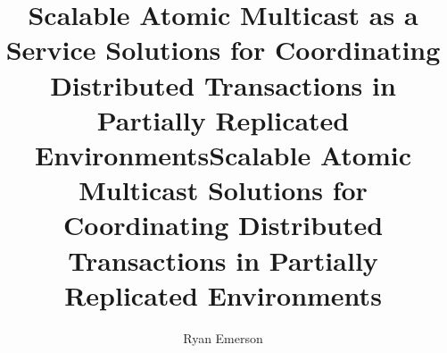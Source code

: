 \title{Scalable Atomic Multicast as a Service Solutions for Coordinating Distributed Transactions in Partially Replicated Environments}
\title{Scalable Atomic Multicast Solutions for Coordinating Distributed Transactions in Partially Replicated Environments}

\author{Ryan Emerson}




 


\subject{LaTeX} 

